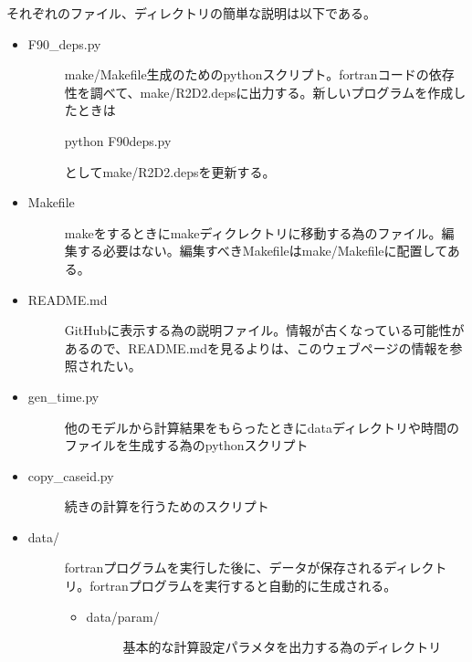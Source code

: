 \documentclass[letterpaper,10pt,dvipdfmx,report]{sphinxmanual}
\begin{document}
それぞれのファイル、ディレクトリの簡単な説明は以下である。
\begin{itemize}
\item {} \begin{description}
\item[{F90\_deps.py}] \leavevmode
make/Makefile生成のためのpythonスクリプト。fortranコードの依存性を調べて、make/R2D2.depsに出力する。新しいプログラムを作成したときは

\begin{sphinxVerbatim}[commandchars=\\\{\}]
python F90\PYGZus{}deps.py
\end{sphinxVerbatim}

としてmake/R2D2.depsを更新する。

\end{description}

\item {} \begin{description}
\item[{Makefile}] \leavevmode
makeをするときにmakeディクレクトリに移動する為のファイル。編集する必要はない。編集すべきMakefileはmake/Makefileに配置してある。

\end{description}

\item {} \begin{description}
\item[{README.md}] \leavevmode
GitHubに表示する為の説明ファイル。情報が古くなっている可能性があるので、README.mdを見るよりは、このウェブページの情報を参照されたい。

\end{description}

\item {} \begin{description}
\item[{gen\_time.py}] \leavevmode
他のモデルから計算結果をもらったときにdataディレクトリや時間のファイルを生成する為のpythonスクリプト

\end{description}

\item {} \begin{description}
\item[{copy\_caseid.py}] \leavevmode
続きの計算を行うためのスクリプト

\end{description}

\item {} \begin{description}
\item[{data/}] \leavevmode
fortranプログラムを実行した後に、データが保存されるディレクトリ。fortranプログラムを実行すると自動的に生成される。
\begin{itemize}
\item {} \begin{description}
\item[{data/param/}] \leavevmode
基本的な計算設定パラメタを出力する為のディレクトリ


\end{description}
\end{itemize}
\end{description}
\end{itemize}
\end{document}
